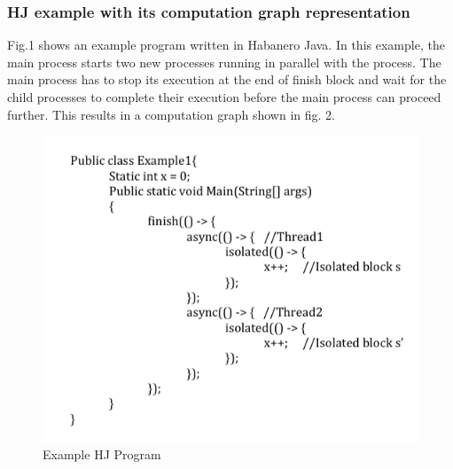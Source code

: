 \subsubsection{HJ example with its computation graph representation}
Fig.1 shows an example program written in Habanero Java. In this example, the main process starts two new processes running in parallel with the process. The main process has to stop its execution at the end of finish block and wait for the child processes to complete their execution before the main process can proceed further. This results in a computation graph shown in fig. 2. 

\begin{figure}[h!]
\centering
\begin{minipage}[b]{0.35\linewidth}
    \includegraphics[scale=0.3]{../figs/Fig1.jpg} 
\caption{Example HJ Program}
\label{fig:minipage1}
\end{minipage}
\quad
\begin{minipage}[b]{0.35\linewidth}

\end{minipage}
\end{figure}
